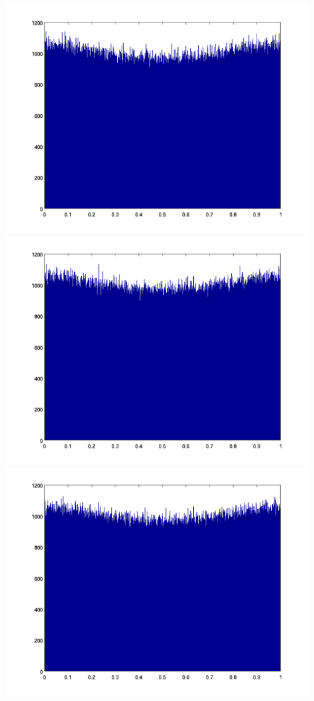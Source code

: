 \documentclass{unswmaths}
\begin{document}
\includegraphics[scale=0.3]{qn_2_a_hist_7}
\includegraphics[scale=0.3]{qn_2_a_hist_8}
\includegraphics[scale=0.3]{qn_2_a_hist_9}
\end{document}
